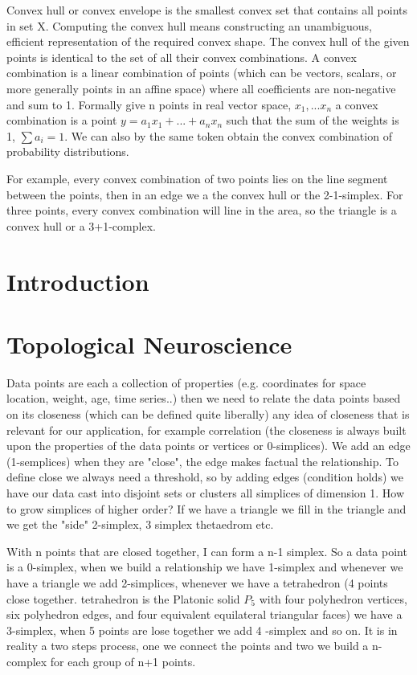 \documentclass[onecollarge,runningheads]{svjour2}
\begin{document}
Convex hull or convex envelope is the smallest convex set that contains all points in set X. Computing the convex hull means constructing an unambiguous, efficient representation of the required convex shape. The convex hull of the given points is identical to the set of all their convex combinations.
A convex combination is a linear combination of points (which can be vectors, scalars, or more generally points in an affine space) where all coefficients are non-negative and sum to 1. Formally give n points in real vector space, $x_1, ... x_n$ a convex combination is a point $y=a_{1}x_1 + ... + a_{n}x_n$ such that the sum of the weights is 1, $\sum a_i = 1$. We can also by the same token obtain the convex combination of probability distributions. 

For example,  every convex combination of two points lies on the line segment between the points, then in an edge we a the convex hull or the 2-1-simplex. For three points, every convex combination will line in the area, so the triangle is a convex hull or a 3+1-complex.

\section{Introduction}
\label{intro}

\section{Topological Neuroscience}
Data points are each a collection of properties (e.g. coordinates for space location, weight, age, time series..) then we need to relate the data points based on its closeness (which can be defined quite liberally) any idea of closeness that is relevant for our application, for example correlation (the closeness is always built upon the properties of the data points or vertices or 0-simplices). We add an edge (1-semplices) when they are "close", the edge makes factual the relationship. To define close we always need a threshold, so by adding edges (condition holds) we have our data cast into disjoint sets or clusters all simplices of dimension 1.
How to grow simplices of higher order? If we have a triangle we fill in the triangle and we get the "side" 2-simplex, 3 simplex thetaedrom etc.

With n points that are closed together, I can form a n-1 simplex. So a data point is a 0-simplex, when we build a relationship we have 1-simplex and whenever we have a triangle we add 2-simplices, whenever we have a tetrahedron (4 points close together.  tetrahedron is the Platonic solid $P_5$ with four polyhedron vertices, six polyhedron edges, and four equivalent equilateral triangular faces) we have a 3-simplex, when 5 points are lose together we add 4 -simplex and so on.
It is in reality a two steps process, one we connect the points and two we build a n-complex for each group of n+1 points.
\end{document}
